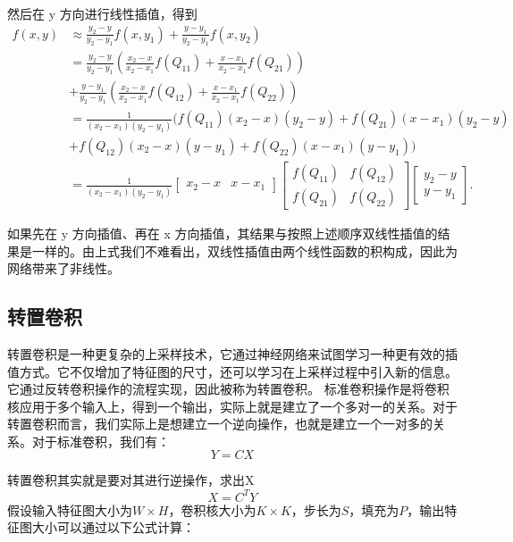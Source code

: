 然后在 y 方向进行线性插值，得到 
\begin{equation}
  \begin{aligned}
    f(x,y) &\approx \frac{y_2-y}{y_2-y_1} f(x, y_1) + \frac{y-y_1}{y_2-y_1} f(x, y_2) \\
&= \frac{y_2-y}{y_2-y_1} \left ( \frac{x_2-x}{x_2-x_1} f(Q_{11}) + \frac{x-x_1}{x_2-x_1} f(Q_{21}) \right ) \\
&+ \frac{y-y_1}{y_2-y_1} \left ( \frac{x_2-x}{x_2-x_1} f(Q_{12}) + \frac{x-x_1}{x_2-x_1} f(Q_{22}) \right ) \\
&= \frac{1}{(x_2-x_1)(y_2-y_1)} \big( f(Q_{11})(x_2-x)(y_2-y)+ f(Q_{21})(x-x_1)(y_2-y)\\
&+  f(Q_{12})(x_2-x)(y-y_1) + f(Q_{22})(x-x_1)(y-y_1) \big)\\
&=\frac{1}{(x_2-x_1)(y_2-y_1)}  \begin{bmatrix} x_2-x & x-x_1 \end{bmatrix} \begin{bmatrix} f(Q_{11}) & f(Q_{12}) \\ f(Q_{21})& f(Q_{22}) \end{bmatrix} \begin{bmatrix}
y_2-y \\ y-y_1 \end{bmatrix}.
  \end{aligned}
\end{equation}

如果先在 y 方向插值、再在 x 方向插值，其结果与按照上述顺序双线性插值的结果是一样的。由上式我们不难看出，双线性插值由两个线性函数的积构成，因此为网络带来了非线性。

\subsection{转置卷积}

转置卷积\cite{2018guideconvolutionarithmeticdeeplearning}是一种更复杂的上采样技术，它通过神经网络来试图学习一种更有效的插值方式。它不仅增加了特征图的尺寸，还可以学习在上采样过程中引入新的信息。它通过反转卷积操作的流程实现，因此被称为转置卷积。
标准卷积操作是将卷积核应用于多个输入上，得到一个输出，实际上就是建立了一个多对一的关系。对于转置卷积而言，我们实际上是想建立一个逆向操作，也就是建立一个一对多的关系。对于标准卷积，我们有：
\begin{equation}
𝑌=𝐶𝑋
\end{equation}

转置卷积其实就是要对其进行逆操作，求出X
\begin{equation}
  X=C^T Y
\end{equation}
假设输入特征图大小为\(W \times H\)，卷积核大小为\(K \times K\)，步长为\(S\)，填充为\(P\)，输出特征图大小可以通过以下公式计算：

